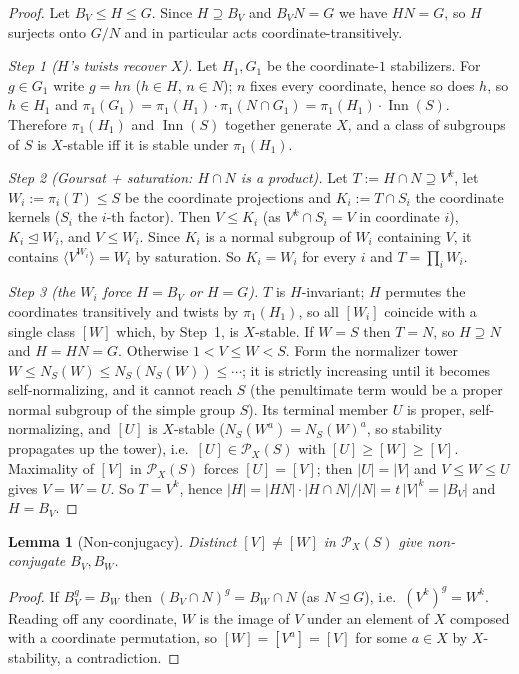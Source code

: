 \documentclass[11pt]{amsart}
\newtheorem{lemma}[theorem]{Lemma}
\theoremstyle{definition}
\theoremstyle{remark}
\DeclareMathOperator{\Inn}{Inn}
\newcommand{\Pos}{\mathcal{P}}
\begin{document}
\begin{proof}
Let $B_V\leq H\leq G$. Since $H\supseteq B_V$ and $B_VN=G$ we have
$HN=G$, so $H$ surjects onto $G/N$ and in particular acts
coordinate-transitively.

\emph{Step 1 ($H$'s twists recover $X$).} Let $H_1,G_1$ be the
coordinate-$1$ stabilizers. For $g\in G_1$ write $g=hn$ ($h\in H$,
$n\in N$); $n$ fixes every coordinate, hence so does $h$, so $h\in H_1$
and $\pi_1(G_1)=\pi_1(H_1)\cdot\pi_1(N\cap G_1)=\pi_1(H_1)\cdot\Inn(S)$.
Therefore $\pi_1(H_1)$ and $\Inn(S)$ together generate $X$, and a class
of subgroups of $S$ is $X$-stable iff it is stable under $\pi_1(H_1)$.

\emph{Step 2 (Goursat + saturation: $H\cap N$ is a product).} Let
$T:=H\cap N\supseteq V^k$, let $W_i:=\pi_i(T)\leq S$ be the coordinate
projections and $K_i:=T\cap S_i$ the coordinate kernels ($S_i$ the $i$-th
factor). Then $V\leq K_i$ (as $V^k\cap S_i=V$ in coordinate $i$),
$K_i\trianglelefteq W_i$, and $V\leq W_i$. Since $K_i$ is a normal
subgroup of $W_i$ containing $V$, it contains
$\langle V^{W_i}\rangle=W_i$ by saturation. So $K_i=W_i$ for every $i$
and $T=\prod_i W_i$.

\emph{Step 3 (the $W_i$ force $H=B_V$ or $H=G$).} $T$ is $H$-invariant;
$H$ permutes the coordinates transitively and twists by $\pi_1(H_1)$, so
all $[W_i]$ coincide with a single class $[W]$ which, by Step~1, is
$X$-stable. If $W=S$ then $T=N$, so $H\supseteq N$ and $H=HN=G$.
Otherwise $1<V\leq W<S$. Form the normalizer tower
$W\leq N_S(W)\leq N_S(N_S(W))\leq\cdots$; it is strictly increasing
until it becomes self-normalizing, and it cannot reach $S$ (the
penultimate term would be a proper normal subgroup of the simple group
$S$). Its terminal member $U$ is proper, self-normalizing, and $[U]$ is
$X$-stable ($N_S(W^a)=N_S(W)^a$, so stability propagates up the tower),
i.e.\ $[U]\in\Pos_X(S)$ with $[U]\geq[W]\geq[V]$. Maximality of $[V]$ in
$\Pos_X(S)$ forces $[U]=[V]$; then $|U|=|V|$ and $V\leq W\leq U$ gives
$V=W=U$. So $T=V^k$, hence $|H|=|HN|\cdot|H\cap N|/|N|=t\,|V|^k=|B_V|$
and $H=B_V$.
\end{proof}

\begin{lemma}[Non-conjugacy]\label{lem:C}
Distinct $[V]\neq[W]$ in $\Pos_X(S)$ give non-conjugate $B_V,B_W$.
\end{lemma}

\begin{proof}
If $B_V^g=B_W$ then $(B_V\cap N)^g=B_W\cap N$ (as $N\trianglelefteq G$),
i.e.\ $(V^k)^g=W^k$. Reading off any coordinate, $W$ is the image of $V$
under an element of $X$ composed with a coordinate permutation, so
$[W]=[V^a]=[V]$ for some $a\in X$ by $X$-stability, a contradiction.
\end{proof}
\end{document}
